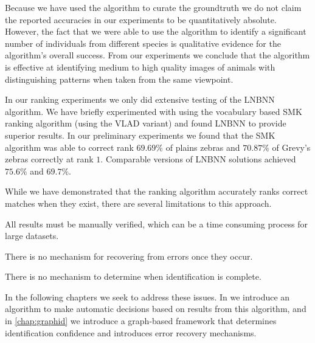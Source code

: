 
    Because we have used the algorithm to curate the groundtruth we do
      not claim the reported accuracies in our experiments to be
      quantitatively absolute.
    However, the fact that we were able to use the algorithm to
      identify a significant number of individuals from different species
      is qualitative evidence for the algorithm's overall success.
    From our experiments we conclude that the algorithm is effective at
      identifying medium to high quality images of animals with
      distinguishing patterns when taken from the same viewpoint.



    In our ranking experiments we only did extensive testing of the LNBNN algorithm.
    We have briefly experimented with using the vocabulary based SMK ranking algorithm (using the VLAD variant)
      and found LNBNN to provide superior results.
    In our preliminary experiments we found that the SMK algorithm was able to correct rank $69.69\percent$ of
      plains zebras and $70.87\percent$ of Grevy's zebras correctly at rank $1$.
    Comparable versions of LNBNN solutions achieved $75.6\percent$ and $69.7\percent$.

    While we have demonstrated that the ranking algorithm accurately ranks
      correct matches when they exist, there are several limitations to this
      approach.
    \begin{itemln}
        \item All results must be manually verified, which can be a time
          consuming process for large datasets.
        \item There is no mechanism for recovering from errors once they
          occur.
        \item There is no mechanism to determine when identification is
          complete.
    \end{itemln}
    In the following chapters we seek to address these issues.
    In  we introduce an algorithm to make automatic
      decisions based on results from this algorithm, and in \cref{chap:graphid}
      we introduce a graph-based framework that determines identification
      confidence and introduces error recovery mechanisms.



